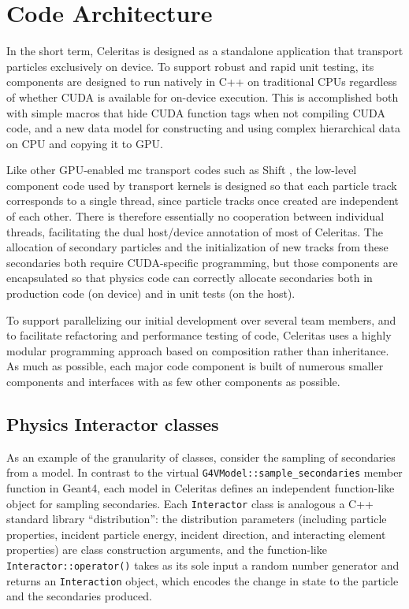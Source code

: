 \section{Code Architecture}\label{code-architecture}

In the short term, Celeritas is designed as a standalone application
that transport particles exclusively on device. To support robust and
rapid unit testing, its components are designed to run natively in C++
on traditional CPUs regardless of whether CUDA is available for
on-device execution. This is accomplished both with simple macros that hide
CUDA function tags when not compiling CUDA code, and a new data model for
constructing and using complex hierarchical data on CPU and copying it to GPU.

Like other GPU-enabled \ac{mc} transport codes such as
Shift \cite{pandya_implementation_2016,hamilton_continuous-energy_2019},
the low-level component code used by transport kernels is designed so
that each particle track corresponds to a single thread, since particle
tracks once created are independent of each other. There is therefore
essentially no cooperation between individual threads, facilitating the
dual host/device annotation of most of Celeritas. The allocation of
secondary particles and the initialization of new tracks from these
secondaries both require CUDA-specific programming, but those components
are encapsulated so that physics code can correctly allocate secondaries both in
production code (on device) and in unit tests (on the host).

To support parallelizing our initial development over several team
members, and to facilitate refactoring and performance testing of code,
Celeritas uses a highly modular programming approach based on
composition rather than inheritance. As much as possible, each major
code component is built of numerous smaller components and interfaces
with as few other components as possible.

\subsection{Physics Interactor classes}

As an example of the granularity of classes, consider the sampling of
secondaries from a model. In contrast to the virtual
\texttt{G4VModel::sample\_secondaries} member function in Geant4, each
model in Celeritas defines an independent function-like object for
sampling secondaries. Each \texttt{Interactor} class is analogous a C++
standard library ``distribution'': the distribution parameters (including
particle properties, incident particle energy, incident direction, and
interacting element properties)
are class construction arguments, and the function-like
\texttt{Interactor::operator()} takes as its sole input a random number
generator and returns an \texttt{Interaction} object, which encodes the
change in state to the particle and the secondaries produced.

